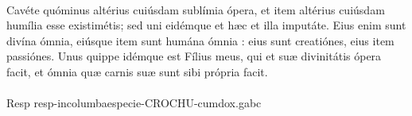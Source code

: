 \documentclass[options]{article}
\begin{document}
\\
Cavéte quóminus altérius cuiúsdam sublímia ópera, et item altérius cuiúsdam humília esse existimétis; sed uni eidémque et hæc et illa imputáte. Eius enim sunt divína ómnia, eiúsque item sunt humána ómnia : eius sunt creatiónes, eius item passiónes. Unus quippe idémque est Fílius meus, qui et suæ divinitátis ópera facit, et ómnia quæ carnis suæ sunt sibi própria facit.\\
\\
Resp resp-incolumbaespecie-CROCHU-cumdox.gabc
\end{document}
